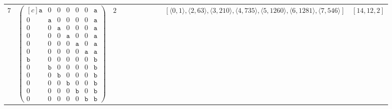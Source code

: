 \documentclass[12pt]{article}
\theoremstyle{definition}
\theoremstyle{plain}
\begin{document}
{\begin{longtable}{@{}cYcccccccZc@{}}
$7$
& $\begin{pmatrix*}[c]
\mathtt{a}   &  0    &  0    &   0  &  0  &  0  &  \mathtt{a}  \\
0   &  \mathtt{a}    &  0    &   0  &  0  &  0  &  \mathtt{a}  \\
0   &  0    &  \mathtt{a}    &   0  &  0  &  0  &  \mathtt{a}  \\
0   &  0    &  0    &   \mathtt{a}  &  0  &  0  &  \mathtt{a}  \\
0   &  0    &  0    &   0  &  \mathtt{a}  &  0  &  \mathtt{a}  \\
0   &  0    &  0    &   0  &  0  &  \mathtt{a}  &  \mathtt{a}  \\
\mathtt{b}   &  0    &  0    &   0  &  0  &  0  &  \mathtt{b}  \\
0   &  \mathtt{b}    &  0    &   0  &  0  &  0  &  \mathtt{b}  \\
0   &  0    &  \mathtt{b}    &   0  &  0  &  0  &  \mathtt{b}  \\
0   &  0    &  0    &   \mathtt{b}  &  0  &  0  &  \mathtt{b}  \\
0   &  0    &  0    &   0  &  \mathtt{b}  &  0  &  \mathtt{b}  \\
0   &  0    &  0    &   0  &  0  &  \mathtt{b}  &  \mathtt{b}
\end{pmatrix*}$
& $2$
&
&
&
&
&
&
& $[\langle0,1\rangle,\allowbreak\langle2,63\rangle,\allowbreak\langle3,210\rangle,\allowbreak\langle4,735\rangle,\allowbreak\langle5,1260\rangle,\allowbreak\langle6,1281\rangle,\allowbreak\langle7,546\rangle]$
& $[14,12,2]$     \\

\cmidrule(lr){2-11}



\end{longtable}}
\end{document}
